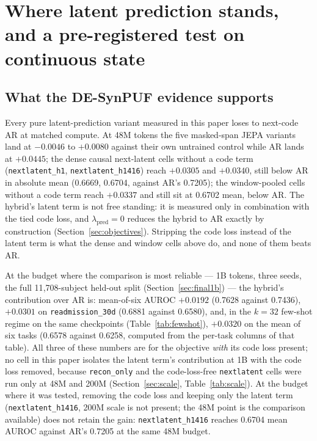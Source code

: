 \documentclass[11pt,a4paper]{article}
\newcommand{\code}[1]{\texttt{\small #1}}
\begin{document}
\section{Where latent prediction stands, and a pre-registered test on
continuous state}
\label{sec:a2}

\subsection{What the DE-SynPUF evidence supports}

Every pure latent-prediction variant measured in this paper loses to
next-code AR at matched compute. At 48M tokens the five masked-span JEPA
variants land at $-0.0046$ to $+0.0080$ against their own untrained control
while AR lands at $+0.0445$; the dense causal next-latent cells without a
code term (\code{nextlatent\_h1}, \code{nextlatent\_h1416}) reach $+0.0305$
and $+0.0340$, still below AR in absolute mean (0.6669, 0.6704, against AR's
0.7205); the window-pooled cells without a code term reach $+0.0337$ and
still sit at 0.6702 mean, below AR. The hybrid's latent term is not free
standing: it is measured only in combination with the tied code loss, and
$\lambda_{\mathrm{pred}} = 0$ reduces the hybrid to AR exactly by
construction (Section~\ref{sec:objectives}). Stripping the code loss instead
of the latent term is what the dense and window cells above do, and none of
them beats AR.

At the budget where the comparison is most reliable --- 1B tokens, three
seeds, the full 11{,}708-subject held-out split (Section~\ref{sec:final1b})
--- the hybrid's contribution over AR is: mean-of-six AUROC $+0.0192$ (0.7628
against 0.7436), $+0.0301$ on \code{readmission\_30d} (0.6881 against
0.6580), and, in the $k{=}32$ few-shot regime on the same checkpoints
(Table~\ref{tab:fewshot}), $+0.0320$ on the mean of six tasks (0.6578 against
0.6258, computed from the per-task columns of that table). All three of
these numbers are for the objective \emph{with} its code loss present; no
cell in this paper isolates the latent term's contribution at 1B with the
code loss removed, because \code{recon\_only} and the code-loss-free
\code{nextlatent} cells were run only at 48M and 200M
(Section~\ref{sec:scale}, Table~\ref{tab:scale}). At the budget where it was
tested, removing the code loss and keeping only the latent term
(\code{nextlatent\_h1416}, 200M scale is not present; the 48M point is the
comparison available) does not retain the gain: \code{nextlatent\_h1416}
reaches 0.6704 mean AUROC against AR's 0.7205 at the same 48M budget.
\end{document}
